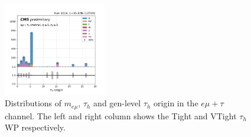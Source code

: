 \begin{figure}
    \includegraphics[width=0.4\textwidth]{chapters/Appendix/sectionJetToTauh/figures/emutau_tauGenFlavor_pickles_lltauVTight.png}
    \caption{Distributions of $m_{e\mu}$, $\tau_h$ \pt and gen-level $\tau_h$ origin in the $e\mu+\tau$ channel. The left and right column shows the Tight and VTight $\tau_h$ WP respectively.}
    \label{fig:appendix:fakeTauId:emutau}
\end{figure}

